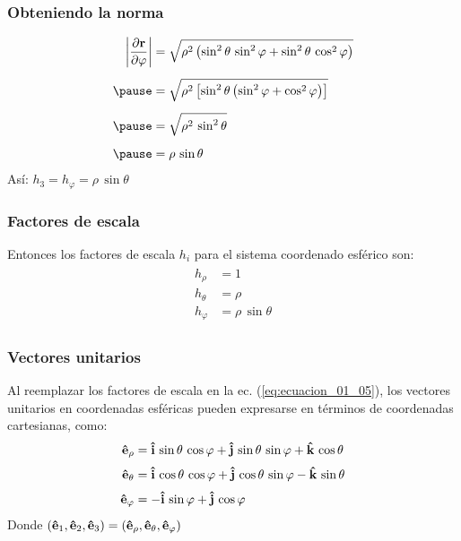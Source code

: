 \documentclass[12pt]{beamer}
\begin{document}
\begin{frame}
\frametitle{Obteniendo la norma}
\begin{eqnarray*}
\begin{aligned}
\abs{\pdv{\vb{r}}{\varphi}} &= \sqrt{\rho^{2} \left( \sin^{2} \theta \, \sin^{2} \varphi + \sin^{2} \theta \, \cos^{2} \varphi \right)} \\[0.5em] \pause
&= \sqrt{\rho^{2} \left[ \sin^{2} \theta \left( \sin^{2} \varphi + \cos^{2} \varphi \right) \right]} \\[0.5em] \pause
&= \sqrt{\rho^{2} \, \sin^{2} \theta} \\[0.5em] \pause
&= \rho \, \sin \theta
\end{aligned}
\end{eqnarray*}
\pause
Así: $h_{3} = h_{\varphi} = \rho \, \sin \theta$
\end{frame}
\begin{frame}
\frametitle{Factores de escala}
Entonces los factores de escala $h_{i}$ para el sistema coordenado esférico son:
\pause
\begin{align}
\begin{aligned}
h_{\rho} &= 1 \\[0.5em]
h_{\theta} &= \rho \\[0.5em]
h_{\varphi} &= \rho \, \sin \theta
\end{aligned}
\label{eq:ecuacion_01_07}
\end{align}
\end{frame}
\begin{frame}
\frametitle{Vectores unitarios}
Al reemplazar los factores de escala en la ec. (\ref{eq:ecuacion_01_05}), los vectores unitarios en coordenadas esféricas pueden expresarse en términos de coordenadas cartesianas, como:
\pause
\begin{align}
\begin{aligned}
\vu{e}_{\rho} &= \vu{i} \, \sin \theta \, \cos \varphi + \vu{j} \, \sin \theta \, \sin \varphi + \vu{k} \, \cos \theta \\[0.25em]
\vu{e}_{\theta} &= \vu{i} \, \cos \theta \, \cos \varphi + \vu{j} \, \cos \theta \, \sin \varphi - \vu{k} \, \sin \theta \\[0.25em]
\vu{e}_{\varphi} &= - \vu{i} \, \sin \varphi + \vu{j} \, \cos \varphi
\end{aligned}
\label{eq:ecuacion_01_08}
\end{align}
Donde $(\vu{e}_{1}, \vu{e}_{2}, \vu{e}_{3}) = (\vu{e}_{\rho}, \vu{e}_{\theta}, \vu{e}_{\varphi})$
\end{frame}
\end{document}
